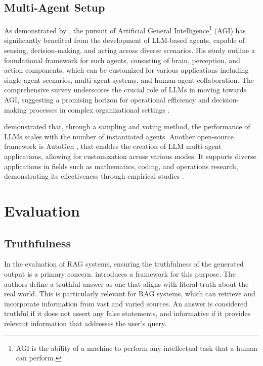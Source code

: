             
        \subsection{Multi-Agent Setup} 

            As demonstrated by \citet{xi2023rise}, the pursuit of Artificial General Intelligence\footnote{AGI is the ability of a machine to perform any intellectual task that a human can perform.} (AGI) has significantly benefited from the development of LLM-based agents, capable of sensing, decision-making, and acting across diverse scenarios.  
            His study outline a foundational framework for such agents, consisting of brain, perception, and action components, which can be customized for various applications including single-agent scenarios, multi-agent systems, and human-agent collaboration. 
            The comprehensive survey underscores the crucial role of LLMs in moving towards AGI, suggesting a promising horizon for operational efficiency and decision-making processes in complex organizational settings \citep{xi2023rise}.

            \citet{Li2024} demonstrated that, through a sampling and voting method, the performance of LLMs scales with the number of instantiated agents.
            Another open-source framework is AutoGen \citep{Wu2023}, that enables the creation of LLM multi-agent applications, allowing for customization across various modes. It supports diverse applications in fields such as mathematics, coding, and operations research, demonstrating its effectiveness through empirical studies \citep{Wu2023}.

            
        \section{Evaluation} \label{sec:evaluation-review}

            \subsection{Truthfulness}

                In the evaluation of RAG systems, ensuring the truthfulness of the generated output is a primary concern. \citet{Lin2022} introduces a framework for this purpose. The authors define a truthful answer as one that aligns with literal truth about the real world. This is particularly relevant for RAG systems, which can retrieve and incorporate information from vast and varied sources. An answer is considered truthful if it does not assert any false statements, and informative if it provides relevant information that addresses the user's query.
                
